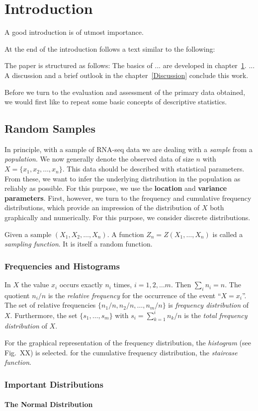 
\chapter{Introduction}\label{Introduction}

A good introduction is of utmost importance.


\medskip
At the end of the introduction follows a text similar to the following:

The paper is structured as follows: The basics of ...
are developed in chapter~\ref{Introduction}. 
...
A
discussion and a brief outlook in the
chapter~\ref{Discussion} conclude this work.

Before we turn to the evaluation and assessment of the primary data obtained, we would first like to repeat some basic concepts of descriptive statistics.

\section{Random Samples}
In principle, with a sample of RNA-seq data \cite{springer} we are dealing with a {\em sample} from a {\em population}.   
We now generally denote the observed data of size $n$ with $X=\{x_1,x_2,\ldots,x_n\}$. 
This data should be described with statistical parameters. From these, we want to infer the underlying distribution in the population as reliably as possible. For this purpose, we use the {\bf location} and {\bf variance parameters}. First, however, we turn to the frequency and cumulative frequency distributions, which provide an impression of the distribution of $X$ both graphically and numerically. For this purpose, we consider discrete distributions.

Given a sample $(X_1,X_2,\ldots,X_n)$. A function $Z_n=Z(X_1,\ldots,X_n)$ is called a {\em sampling function}. It is itself a random function.


\subsection{Frequencies and Histograms}
In $X$ the value $x_i$ occurs exactly $n_i$ times, $i=1,2,\ldots m$. Then $\sum_i n_i = n$. The quotient $n_i/n$ is the {\em relative frequency} for the occurrence of the event ``$X=x_i$''.
The set of relative frequencies $\{n_1/n,n_2/n,\ldots, n_m/n\}$ is {\em frequency distribution} of $X$. Furthermore, the set $\{s_1,\ldots,s_m\}$ with $s_i=\sum_{k=1}^{i}n_k/n$ is the {\em total frequency distribution} of $X$.

For the graphical representation of the frequency distribution, the {\em histogram} (see Fig.~XX) is selected. for the cumulative frequency distribution, the {\em staircase function}.

%
\subsection{Important Distributions}

\subsubsection{The Normal Distribution}


